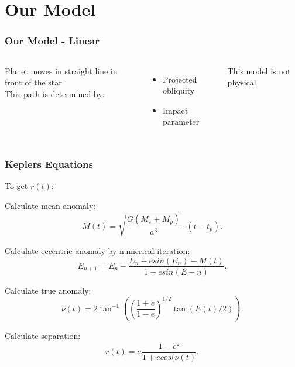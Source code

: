 \documentclass[show notes]{beamer}
\begin{document}
\begin{frame}
\frametitle{}

\end{frame}

\section{Our Model}

\begin{frame}
\frametitle{Our Model - Linear}
\begin{columns}
		Planet moves in straight line in front of the star\\
		
		This path is determined by:
		\begin{itemize}
			\item Projected obliquity
			\item Impact parameter
		\end{itemize}
		
		This model is not physical
		

\end{columns}
\end{frame}


\begin{frame}
\frametitle{Keplers Equations}	

To get $r(t)$:

Calculate mean anomaly:
\begin{equation*}
M(t) = \sqrt{\frac{G (M_\star + M_p)}{a^3}} \cdot (t - t_p).
\end{equation*}

Calculate eccentric anomaly by numerical iteration:
\begin{equation*}
E_{n+1} = E_n - \frac{E_n - e sin(E_n) - M(t)}{1 - e sin(E-n)}.
\end{equation*}

Calculate true anomaly:
\begin{equation*}
\nu(t) = 2 \tan^{-1}( \left(\frac{1+e}{1-e}\right)^{1/2} \tan(E(t)/2) ).
\end{equation*}

Calculate separation:
\begin{equation*}
r(t) = a \frac{1 - e^2}{1 + e cos(\nu(t)}.
\end{equation*}

\end{frame}
\end{document}
